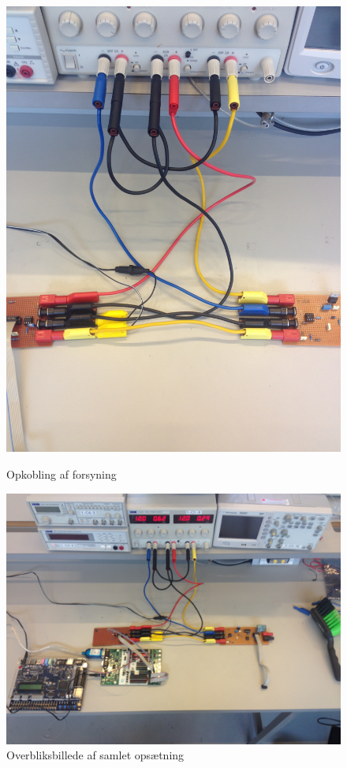 \begin{figure}[htb]
  \begin{minipage}{0.45\textwidth}
    \centering
      \includegraphics[width=\textwidth]{billeder/IntTest/forsyning}
      \caption{Opkobling af forsyning}
    \label{fig:opkobling_forsyning}
  \end{minipage}
  \hspace{0.1\textwidth}
  \begin{minipage}{0.45\textwidth}
    \centering
      \includegraphics[width=\textwidth]{billeder/IntTest/system}
      \caption{Overbliksbillede af samlet opsætning}
    \label{fig:system_sammensat}
  \end{minipage}
\end{figure}


